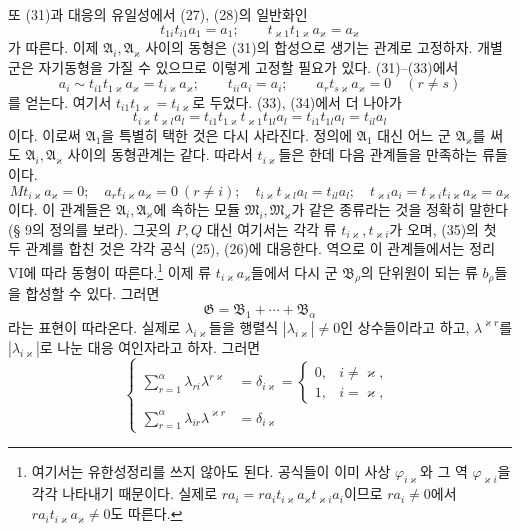또 (31)과 대응의 유일성에서 (27), (28)의 일반화인
\begin{equation}
 t_{1i}t_{i1}a_1=a_1;\qquad
 t_{\varkappa1}t_{1\varkappa}a_\varkappa=a_\varkappa
\tag{33}
\end{equation}
가 따른다. 이제 \(\mathfrak A_i,\mathfrak A_\varkappa\) 사이의 동형은 (31)의 합성으로 생기는 관계로 고정하자. 개별 군은 자기동형을 가질 수 있으므로 이렇게 고정할 필요가 있다. (31)--(33)에서
\begin{equation}
 a_i\sim t_{i1}t_{1\varkappa}a_\varkappa
      =t_{i\varkappa}a_\varkappa;\qquad
 t_{ii}a_i=a_i;\qquad
 a_rt_{s\varkappa}a_\varkappa=0\quad(r\ne s)
\tag{34}
\end{equation}
를 얻는다. 여기서 \(t_{i1}t_{1\varkappa}=t_{i\varkappa}\)로 두었다. (33), (34)에서 더 나아가
\[
 t_{i\varkappa}t_{\varkappa l}a_l
 =t_{i1}t_{1\varkappa}t_{\varkappa1}t_{1l}a_l
 =t_{i1}t_{1l}a_l=t_{il}a_l
\]
이다. 이로써 \(\mathfrak A_1\)을 특별히 택한 것은 다시 사라진다. 정의에 \(\mathfrak A_1\) 대신 어느 군 \(\mathfrak A_\varkappa\)를 써도 \(\mathfrak A_i,\mathfrak A_\varkappa\) 사이의 동형관계는 같다. 따라서 \(t_{i\varkappa}\)들은 한데 다음 관계들을 만족하는 류들이다.
\begin{equation}
 Mt_{i\varkappa}a_\varkappa=0;\quad
 a_rt_{i\varkappa}a_\varkappa=0\ (r\ne i);\quad
 t_{i\varkappa}t_{\varkappa l}a_l=t_{il}a_l;\quad
 t_{\varkappa i}a_i
 =t_{\varkappa i}t_{i\varkappa}a_\varkappa
 =a_\varkappa
\tag{35}
\end{equation}
이다. 이 관계들은 \(\mathfrak A_i,\mathfrak A_\varkappa\)에 속하는 모듈 \(\mathfrak M_i,\mathfrak M_\varkappa\)가 같은 종류라는 것을 정확히 말한다(§ 9의 정의를 보라). 그곳의 \(P,Q\) 대신 여기서는 각각 류 \(t_{i\varkappa},t_{\varkappa i}\)가 오며, (35)의 첫 두 관계를 합친 것은 각각 공식 (25), (26)에 대응한다. 역으로 이 관계들에서는 정리 VI에 따라 동형이 따른다.\footnote{여기서는 유한성정리를 쓰지 않아도 된다. 공식들이 이미 사상 \(\varphi_{i\varkappa}\)와 그 역 \(\varphi_{\varkappa i}\)을 각각 나타내기 때문이다. 실제로 \(ra_i=ra_i t_{i\varkappa}a_\varkappa t_{\varkappa i}a_i\)이므로 \(ra_i\ne0\)에서 \(ra_i t_{i\varkappa}a_\varkappa\ne0\)도 따른다.}
이제 류 \(t_{i\varkappa}a_\varkappa\)들에서 다시 군 \(\mathfrak B_\rho\)의 단위원이 되는 류 \(b_\rho\)들을 합성할 수 있다. 그러면
\[
 \mathfrak G=\mathfrak B_1+\cdots+\mathfrak B_\alpha
\]
라는 표현이 따라온다. 실제로 \(\lambda_{i\varkappa}\)들을 행렬식 \(|\lambda_{i\varkappa}|\ne0\)인 상수들이라고 하고, \(\lambda^{\varkappa r}\)를 \(|\lambda_{i\varkappa}|\)로 나눈 대응 여인자라고 하자. 그러면
\begin{equation}
\left\{
\begin{aligned}
 \sum_{r=1}^{\alpha}\lambda_{ri}\lambda^{r\varkappa}
 &=\delta_{i\varkappa}
 =\begin{cases}0,&i\ne\varkappa,\\1,&i=\varkappa,\end{cases}\\
 \sum_{r=1}^{\alpha}\lambda_{ir}\lambda^{\varkappa r}
 &=\delta_{i\varkappa}
\end{aligned}\right.
\tag{36}
\end{equation}
